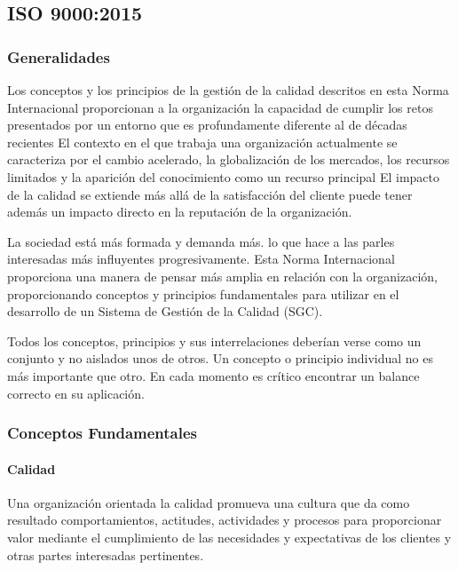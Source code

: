 \subsection{ISO 9000:2015}
	\subsubsection{Generalidades}
		\par
			Los conceptos y los principios de la gestión de la calidad descritos en esta Norma Internacional
			proporcionan a la organización la capacidad de cumplir los retos presentados por un entorno que es
			profundamente diferente al de décadas recientes El contexto en el que trabaja una organización
			actualmente se caracteriza por el cambio acelerado, la globalización de los mercados, los recursos
			limitados y la aparición del conocimiento como un recurso principal El impacto de la calidad se extiende
			más allá de la satisfacción del cliente puede tener además un impacto directo en la reputación de la
			organización.
		
		\newpage
		\thispagestyle{plain}
	
		\par 
			\noindent La sociedad está más formada y demanda más. lo que hace a las parles interesadas más influyentes
			progresivamente. Esta Norma Internacional proporciona una manera de pensar más amplia en relación
			con la organización, proporcionando conceptos y principios fundamentales para utilizar en el desarrollo
			de un Sistema de Gestión de la Calidad (SGC).
			
		\par \noindent 
			Todos los conceptos, principios y sus interrelaciones deberían verse como un conjunto y no aislados unos de otros. Un concepto o principio individual no es más importante que otro. En cada momento es crítico encontrar un balance correcto en su aplicación.
			
	\subsubsection{Conceptos Fundamentales}
	
		\paragraph{Calidad}
			Una organización orientada la calidad promueva una cultura que da como resultado comportamientos,
			actitudes, actividades y procesos para proporcionar valor mediante el cumplimiento de las necesidades y
			expectativas de los clientes y otras partes interesadas pertinentes.
			
